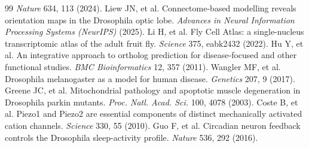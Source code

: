 \documentclass[9pt,twocolumn,twoside]{article}
\begin{document}
\begin{thebibliography}{99}
\textit{Nature} 634, 113 (2024).
 Liew JN, et al. Connectome-based modelling reveals orientation maps in
the Drosophila optic lobe. \textit{Advances in Neural Information Processing Systems (NeurIPS)}
(2025).
 Li H, et al. Fly Cell Atlas: a single-nucleus transcriptomic atlas of the adult
fruit fly. \textit{Science} 375, eabk2432 (2022).
 Hu Y, et al. An integrative approach to ortholog prediction for disease-focused and
other functional studies. \textit{BMC Bioinformatics} 12, 357 (2011).
 Wangler MF, et al. Drosophila melanogaster as a model for human disease.
\textit{Genetics} 207, 9 (2017).
 Greene JC, et al. Mitochondrial pathology and apoptotic muscle degeneration in
Drosophila parkin mutants. \textit{Proc. Natl. Acad. Sci.} 100, 4078 (2003).
 Coste B, et al. Piezo1 and Piezo2 are essential components of distinct
mechanically activated cation channels. \textit{Science} 330, 55 (2010).
 Guo F, et al. Circadian neuron feedback controls the Drosophila sleep-activity
profile. \textit{Nature} 536, 292 (2016).
\end{thebibliography}
\end{document}
